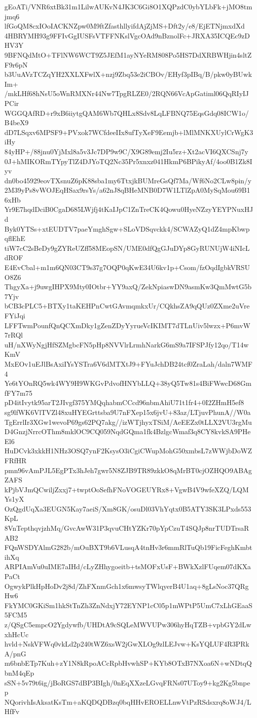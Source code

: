 gEoATi/VNR6xtBk31m1LilwAUKvN4JK3C6Gi8O1XQPzdC0ybYLbFk+jMO8tmjmq6
lfGoQM8cxIOoIACKNZpw0M9ftZfasthllyifdAjZjMS+Dft2y/e8/EjETNjmxdXd
4HBRYMH93g9FFIvGgIUSFsVTFFNKslVgcOAd9nBznolFc+JRXA35ICQEc9zDHV3Y
9BFNQdMtO+TFlNW6WCT9Z5JEfM1ayNYeRM808Po5HS7DdXRBWHjin4sltZF9r6pN
b3UuAVzTCZqYH2XXLXFwlX+nzj9Zbq53e2iCBOv/EHyf3pIBq/B/pkw0yBUwkIm+
/mkLHf68hNsU5oWnRMXNr44Nw7TpgRLZE0/2RQN66VcApGatiml06QqRIyIJPCir
WGGQAfRD+r9xB6iiytgQAM6Wb7QHLx8Sdv8LqLFBNQ75EqsGdq08ICW1o/B4beX9
dD7LSqxv6MPSF9+PVxok7WCfdeeIIx8ufTyXeF9Eemjb+lMlMNKXUylCrWgK3iHy
84yHP+/88jnu0YjMxl8a5v3Jc7DP9w9C/X9G89emj2Iu5rz+Xt2acVI6QXCSnj7y
0J+hMIKORmTYpyTlZ4DJYoTQ2Nc35Pr5xnxz041HkmP6BPikyAf/4oo0B1Zk8Iyv
dn0bo45929eovTXsnuZ6pK88sba1my6TtxjkBUMreGsQf7Ma/Wf6No2CLw8pin/y
2M39yPs8vWOJEqHSax9rsYs/a62nJ8qBHeMNB0D7W1LTlZpA0MySqMou69B16xHb
Yr9E7hqdDciB0CgaD685LWjfj4tKaIJpC1ZnTreCK4Qowu0HyeNZzyYEYPNuxHJd
Byk0YTSs+xtEUDTV7paeYmghSgw+SLoVDSqvckk4/SCWAZyQ1dZ4mpKbwpqflEhE
tiW7cC2sBeDy9gZYReUZff58MEopSN/UME0dfQgGJuDYp8GyRUNUjW4iNIcLdROF
E4EvCbal+m1m6QN03CT9s37g7OQP0qKwE34U6kv1p+Csom/fzOqdIgbkVRSUO8Z6
ThgyXa+j9uwgIHPX9Mty0IOtbr+YY9axQ/ZekNpiaswDN9asmKw3QmMwtG5b7Yjv
bCB3cPLC5+BTXy1taKEHPnCwtGAvmqmkxUr/CQkhsZA9qQUz0ZXme2uVreFYiJqi
LFFTwmPounfQnQCXmDky1gZenZDyYyrueVcIKIMT7dTLnUiv5lwzx+P6mvW7rRQl
uH/nXWyNgjHfSZMgbcFN5pHp8NVVlrLrmhNarkG6mS9a7IFSPJfy12qo/T14wKmV
MxEOv1uEJlBsAxiIYsYSTra6V6dMTXtJ9+FYuJchDB24tcf0ZraLah/daln7WMF4
Ye6tYOnRQ5wk4WY9H9WKGvPdvofHNYbLLQ+38yQ5Tw81s4BiFWwcD68GmfFY7m75
pD4itIvytk95arT2JIvgf375YMQqhabmCCcd96nbmAhiU71t1fr4+0I2ZHmH5ef8
sg9lfWK6VlTVZl48xuHYEGrttsba9U7nFXep15x6jvU+83az/LTjuvPhunA//W0a
TgErrlIr3XGw1wevoP69gs62PQ7akg//izWTjhyxTSiM/AeEEZx0tLLX2VU3rgMu
D4GnzjNrrcOThm8mklOC9CQ059NqdGQma1fk4BzlgcWmaf3q8CY8kvkSA9PHeEl6
HuDCvk3xkkH1NHz3OSQ7ynF2KsysO3iCgiCWupMohG50xmbsL7zWWjbDoWZFRfHR
pmn96vAmPJL5EgPTx3hJeh7gwr5N8ZJB9TR89zkkO8qMrBT0cjOZHQO9ABAgZAFS
kPjbVJmQCwiljZxxj7+twptOoSefhFNoVOGEUYRx8+VgwB4V9wfeXZQ/LQMYs1yX
OzQgdUqXa3EUGN5Kay7aeiS/Xm8GK/osuDl03VhYqtx0B5ATY3SK3LPxds553KpL
8VnTepthqvjzhMq/GvcAwW31P3qvuCHtYZKr70pYpCzuT4SQJp8nrTUDTrsaRAB2
FQnWSDYAlmG282b/mOuBXT9b6VLusqA4tnHv3r6mmRlTuQb19FicFeghKmbtihXq
ARPIAmVu0uIME7aIHd/cLyZHhygoeitb+tsMOFxUsF+BWkXzlFUqem07dKXaPaCt
OgwykPlkHpHoDv2j8d/ZhFXnmGch1x6mwsyTWlqyerB4U1aq+8gLsNoc37QRgHw6
FkYMC0GKiSm1hkStTnZh3ZnNdxjY72EYNP1cC05p1mWPtP5UmC7xLhGEaaS5FCM5
z/QSgC5empcO2Ygdywfb/UHDtA9cSQLeMWVUPw306hyHqTZB+vpbGY2dLwxhHcUc
hvld+NskVFWq0vkLd2p240tWZ6xsW2jGwXLOg9zlLEJvw+KsYQLUF4R3PRkA/pnG
m6bnbETp7Kuh+zY1N8kRpoACcRpbHvwhSP+KYb8OTxB7NXoa6N+wNDtqQbnM4qEp
sSN+5v79t6ig/jBoRGS7dBP3BIgh/0nEqXXzeLGvqFRNs07UToy9+kg2Kg5bnpep
NQorivhIsAksatKsTm+aKQDQDBzq0bqHHvEROELLnwVtPzRSdsxrq8oWJ4/LHfFv
